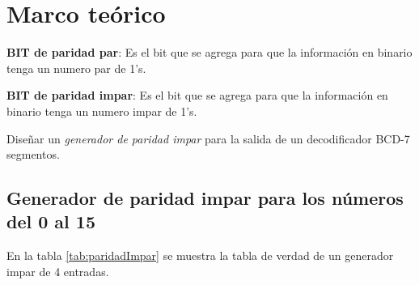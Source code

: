 \documentclass[12pt, oneside, openany]{article}
\begin{document}
\section{Marco teórico}
{\sffamily\Large
    \hspace{0.5cm} \textbf{BIT de paridad par}: Es el bit que se agrega para que la información en binario tenga un numero par de 1's.
    
    \hspace{0.5cm} \textbf{BIT de paridad impar}: Es el bit que se agrega para que la información en binario tenga un numero impar de 1's.
    
    \hspace{0.5cm} Diseñar un \emph{generador de paridad impar} para la salida de un decodificador BCD-7 segmentos.
    
    \subsection{Generador de paridad impar para los números del 0 al 15}
    
    \hspace{0.5cm} En la tabla \ref{tab:paridadImpar} se muestra la tabla de verdad de un generador impar de 4 entradas.
    
}
\end{document}
